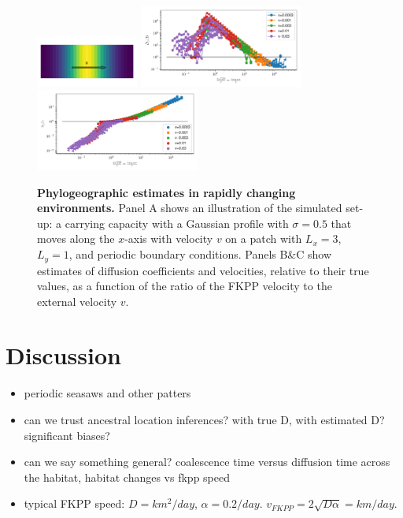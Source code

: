 \documentclass[aps,rmp, twocolumn]{revtex4}
\begin{document}
\begin{figure}
    \includegraphics[width=0.3\textwidth]{figures/traveling_wave}
    \includegraphics[width=0.48\textwidth]{figures/waves_D}
    \includegraphics[width=0.48\textwidth]{figures/waves_v}
    \caption{\label{fig:traveling_wave} {\bf Phylogeographic estimates in rapidly changing environments.} Panel A shows an illustration of the simulated set-up: a carrying capacity with a Gaussian profile with $\sigma=0.5$ that moves along the $x$-axis with velocity $v$ on a patch with $L_x=3$, $L_y=1$, and periodic boundary conditions.
    Panels B\&C show estimates of diffusion coefficients and velocities, relative to their true values, as a function of the ratio of the FKPP velocity to the external velocity $v$. }
\end{figure}


\section*{Discussion}


\begin{itemize}
    \item periodic seasaws and other patters
    \item can we trust ancestral location inferences? with true D, with estimated D? significant biases?
    \item can we say something general? coalescence time versus diffusion time across the habitat, habitat changes vs fkpp speed
    \item typical FKPP speed: $D=km^2/day$, $\alpha = 0.2/day$. $v_{FKPP} = 2\sqrt{D\alpha} = km/day$.
\end{itemize}



\end{document}
